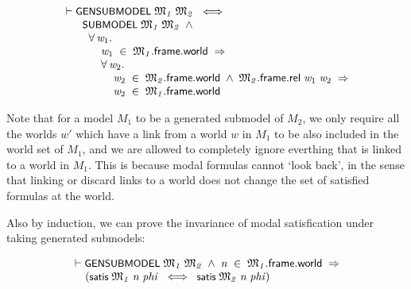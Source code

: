 \documentclass[letterpaper]{article}
\renewcommand{\HOLConst}[1]{{\textsf{\upshape\small #1}}}
\newenvironment{holmath}{\begin{displaymath}\begin{array}{l}}{\end{array}\end{displaymath}\ignorespacesafterend}
\begin{document}
\begin{holmath}
  \ensuremath{\HOLTokenTurnstile}\HOLConst{GENSUBMODEL}\;\HOLFreeVar{\ensuremath{\mathfrak{M}\sb{1}}}\;\HOLFreeVar{\ensuremath{\mathfrak{M}\sb{2}}}\;\HOLSymConst{\HOLTokenEquiv{}}\\
\;\;\;\;\;\;\;\HOLConst{SUBMODEL}\;\HOLFreeVar{\ensuremath{\mathfrak{M}\sb{1}}}\;\HOLFreeVar{\ensuremath{\mathfrak{M}\sb{2}}}\;\HOLSymConst{\HOLTokenConj{}}\\
\;\;\;\;\;\;\;\;\;\HOLSymConst{\HOLTokenForall{}}\HOLBoundVar{w\sb{\mathrm{1}}}.\\
\;\;\;\;\;\;\;\;\;\;\;\;\;\HOLBoundVar{w\sb{\mathrm{1}}}\;\HOLSymConst{\HOLTokenIn{}}\;\HOLFreeVar{\ensuremath{\mathfrak{M}\sb{1}}}.\HOLFieldName{frame}.\HOLFieldName{world}\;\HOLSymConst{\HOLTokenImp{}}\\
\;\;\;\;\;\;\;\;\;\;\;\;\;\HOLSymConst{\HOLTokenForall{}}\HOLBoundVar{w\sb{\mathrm{2}}}.\\
\;\;\;\;\;\;\;\;\;\;\;\;\;\;\;\;\;\HOLBoundVar{w\sb{\mathrm{2}}}\;\HOLSymConst{\HOLTokenIn{}}\;\HOLFreeVar{\ensuremath{\mathfrak{M}\sb{2}}}.\HOLFieldName{frame}.\HOLFieldName{world}\;\HOLSymConst{\HOLTokenConj{}}\;\HOLFreeVar{\ensuremath{\mathfrak{M}\sb{2}}}.\HOLFieldName{frame}.\HOLFieldName{rel}\;\HOLBoundVar{w\sb{\mathrm{1}}}\;\HOLBoundVar{w\sb{\mathrm{2}}}\;\HOLSymConst{\HOLTokenImp{}}\\
\;\;\;\;\;\;\;\;\;\;\;\;\;\;\;\;\;\HOLBoundVar{w\sb{\mathrm{2}}}\;\HOLSymConst{\HOLTokenIn{}}\;\HOLFreeVar{\ensuremath{\mathfrak{M}\sb{1}}}.\HOLFieldName{frame}.\HOLFieldName{world}
\end{holmath}

Note that for a model $M_1$ to be a generated submodel of $M_2$, we only require all the worlds $w'$ which have a link from a world $w$ in $M_1$ to be also included in the world set of $M_1$, and we are allowed to completely ignore everthing that is linked to a world in $M_1$. This is because modal formulas cannot `look back', in the sense that linking or discard links to a world does not change the set of satisfied formulas at the world. 


Also by induction, we can prove the invariance of modal satisfication under taking generated submodels:

\begin{holmath}
  \ensuremath{\HOLTokenTurnstile}\HOLConst{GENSUBMODEL}\;\HOLFreeVar{\ensuremath{\mathfrak{M}\sb{1}}}\;\HOLFreeVar{\ensuremath{\mathfrak{M}\sb{2}}}\;\HOLSymConst{\HOLTokenConj{}}\;\HOLFreeVar{n}\;\HOLSymConst{\HOLTokenIn{}}\;\HOLFreeVar{\ensuremath{\mathfrak{M}\sb{1}}}.\HOLFieldName{frame}.\HOLFieldName{world}\;\HOLSymConst{\HOLTokenImp{}}\\
\;\;\;\;\;(\HOLConst{satis}\;\HOLFreeVar{\ensuremath{\mathfrak{M}\sb{1}}}\;\HOLFreeVar{n}\;\HOLFreeVar{phi}\;\HOLSymConst{\HOLTokenEquiv{}}\;\HOLConst{satis}\;\HOLFreeVar{\ensuremath{\mathfrak{M}\sb{2}}}\;\HOLFreeVar{n}\;\HOLFreeVar{phi})
\end{holmath}
\end{document}
